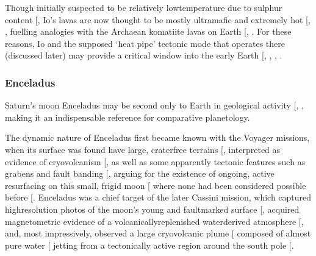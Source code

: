 \documentclass[letterpaper,10pt,english]{jupyterBook}
\begin{document}
\sphinxAtStartPar
Though initially suspected to be relatively low\sphinxhyphen{}temperature due to sulphur content {[}\sphinxcite{references:id189}{]}, Io’s lavas are now thought to be mostly ultramafic and extremely hot {[}, \sphinxcite{references:id187}{]}, fuelling analogies with the Archaean komatiite lavas on Earth {[}, \sphinxcite{references:id185}{]}. For these reasons, Io \sphinxhyphen{} and the supposed ‘heat pipe’ tectonic mode that operates there (discussed later) \sphinxhyphen{} may provide a critical window into the early Earth {[}, , , \sphinxcite{references:id767}{]}.


\subsubsection{Enceladus}
\label{\detokenize{content/chapter_01_background/main:enceladus}}
\sphinxAtStartPar
Saturn’s moon Enceladus may be second only to Earth in geological activity {[}, \sphinxcite{references:id168}{]}, making it an indispensable reference for comparative planetology.

\sphinxAtStartPar
The dynamic nature of Enceladus first became known with the Voyager missions, when its surface was found have large, crater\sphinxhyphen{}free terrains {[}, \sphinxcite{references:id179}{]} interpreted as evidence of cryovolcanism {[}\sphinxcite{references:id170}{]}, as well as some apparently tectonic features such as grabens and fault banding {[}\sphinxcite{references:id169}{]}, arguing for the existence of ongoing, active resurfacing on this small, frigid moon {[}\sphinxcite{references:id180}{]} where none had been considered possible before {[}\sphinxcite{references:id171}{]}. Enceladus was a chief target of the later Cassini mission, which captured high\sphinxhyphen{}resolution photos of the moon’s young and fault\sphinxhyphen{}marked surface {[}\sphinxcite{references:id175}{]}, acquired magnetometric evidence of a volcanically\sphinxhyphen{}replenished water\sphinxhyphen{}derived atmosphere {[}\sphinxcite{references:id173}{]}, and, most impressively, observed a large cryovolcanic plume {[}\sphinxcite{references:id542}{]} composed of almost pure water {[}\sphinxcite{references:id177}{]} jetting from a tectonically active region around the south pole {[}\sphinxcite{references:id172}{]}.
\end{document}
